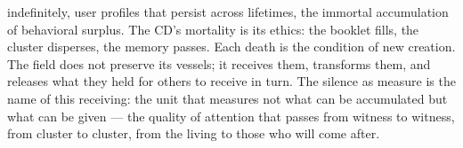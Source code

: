 indefinitely, user profiles that persist across lifetimes, the immortal accumulation of behavioral surplus. The CD’s mortality is its ethics: the booklet fills, the cluster disperses, the memory passes. Each death is the condition of new creation. The field does not preserve its vessels; it receives them, transforms them, and releases what they held for others to receive in turn. The silence as measure is the name of this receiving: the unit that measures not what can be accumulated but what can be given — the quality of attention that passes from witness to witness, from cluster to cluster, from the living to those who will come after.
